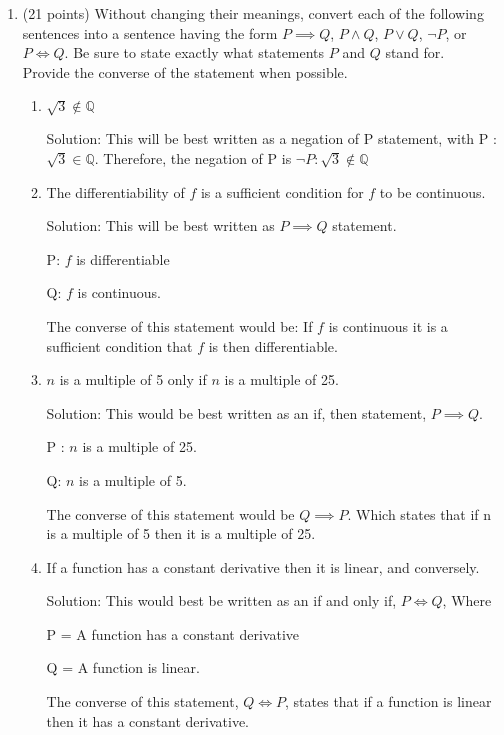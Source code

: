\documentclass[11pt]{amsart}
\newcommand{\Q}{\mathbb{Q}}
\begin{document}
\begin{enumerate}
\vspace{.2in}

\item (21 points) Without changing their meanings, convert each of the following sentences into a sentence having the form $P\implies Q$, $P\wedge Q$, $P\vee Q$, $\neg P$, or $P\iff Q$. Be sure to state exactly what statements $P$ and $Q$ stand for. \\
Provide the converse of the statement when possible. 
\begin{enumerate}
\item $\sqrt{3}\not\in\mathbb{Q}$

Solution: This will be best written as a negation of P statement, with P : $\sqrt{3} \in \Q$. Therefore, the negation of P is $\neg P : \sqrt{3} \not\in  \Q$

\item The differentiability of $f$ is a sufficient condition for $f$ to be continuous.

Solution: This will be best written as $P\implies Q$ statement. 

P: $f$ is differentiable

Q: $f$ is continuous. 

The converse of this statement would be: If $f$ is continuous it is a sufficient condition that $f$ is then differentiable. 




\item $n$ is a multiple of 5 only if $n$ is a multiple of 25.

Solution: This would be best written as an if, then statement, $P \implies Q$. 

P : $n$ is a multiple of 25. 

Q: $n$ is a multiple of 5. 

The converse of this statement would be $Q \implies P$. Which states that if n is a multiple of 5 then it is a multiple of 25.

\item If a function has a constant derivative then it is linear, and conversely. 

Solution: This would best be written as an if and only if, $P\iff Q$, Where

P = A function has a constant derivative

Q = A function is linear. 

The converse of this statement, $Q\iff P$, states that if a function is linear then it has a constant derivative.


\end{enumerate}
\end{enumerate}
\end{document}
